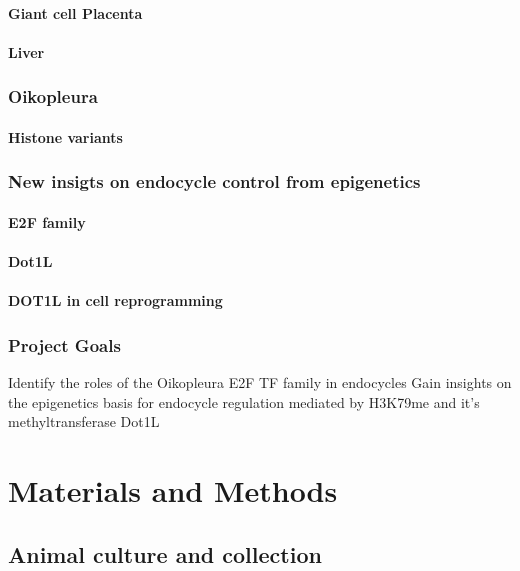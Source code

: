 \documentclass[11pt,twoside,a4paper]{report}
\begin{document}
		\subsubsection{Giant cell Placenta}
		\subsubsection{Liver}
		\subsection{Oikopleura}
		\subsubsection{Histone variants}

		\subsection{New insigts on endocycle control from epigenetics}
			\subsubsection{E2F family}
			\subsubsection{Dot1L}
			\subsubsection{DOT1L in cell reprogramming}

		\subsection{Project Goals}
		Identify the roles of the Oikopleura E2F TF family in endocycles
		Gain insights on the epigenetics basis for endocycle regulation mediated by H3K79me and it's methyltransferase Dot1L

\clearpage

\chapter{Materials and Methods}
	\section{Animal culture and collection}
\end{document}
